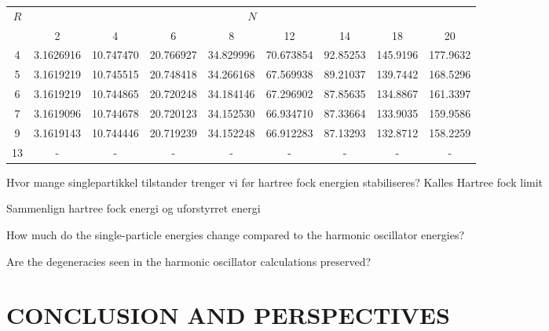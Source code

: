 \documentclass[11pt,english,a4paper]{article}
\begin{document}
\begin{tabular}{c | c c c c c c c c}
$R$ & \multicolumn{8}{c}{$N$}\\
  & 2         & 4         & 6         & 8         &12         &14        & 18       & 20\\
  \hline
4 & 3.1626916 & 10.747470 & 20.766927 & 34.829996 & 70.673854 & 92.85253 & 145.9196 & 177.9632\\
5 & 3.1619219 & 10.745515 & 20.748418 & 34.266168 & 67.569938 & 89.21037 & 139.7442 & 168.5296\\
6 & 3.1619219 & 10.744865 & 20.720248 & 34.184146 & 67.296902 & 87.85635 & 134.8867 & 161.3397\\
7 & 3.1619096 & 10.744678 & 20.720123 & 34.152530 & 66.934710 & 87.33664 & 133.9035 & 159.9586\\
9 & 3.1619143 & 10.744446 & 20.719239 & 34.152248 & 66.912283 & 87.13293 & 132.8712 & 158.2259\\
13& -         & -         & -         & -         & -         & -        & -        & -       \\
\end{tabular}

Hvor mange singlepartikkel tilstander trenger vi før hartree fock energien stabiliseres? Kalles Hartree fock limit

Sammenlign hartree fock energi og uforstyrret energi

How much do the single-particle energies change compared to the harmonic
oscillator energies? 

Are the degeneracies seen in the harmonic oscillator calculations preserved?

\section*{\uppercase{Conclusion and perspectives}}
\end{document}
